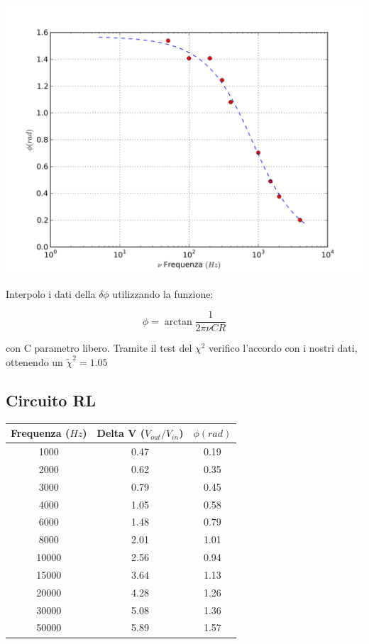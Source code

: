 \begin{center}
 \includegraphics[scale=0.70]{grafici/C3/fasecap.png}
\end{center}



Interpolo i dati della $\delta \phi$ utilizzando la funzione:

$$ \phi = \arctan \frac{1}{2\pi\nu C R} $$

con C parametro libero. Tramite il test del $\chi^2$ verifico l'accordo con i nostri dati, ottenendo un $\tilde{\chi}^2 = 1.05$

\subsection{Circuito RL}
\begin{center}

\begin{tabular}{*{3}{c}}
Frequenza ($Hz$) & Delta V ($V_{out}/V_{in}$) & $\phi (rad)$ \\
\midrule
1000& 0.47 & 0.19 \\
2000 & 0.62 & 0.35\\
3000 & 0.79 & 0.45\\
4000 & 1.05 & 0.58\\
6000 & 1.48 & 0.79\\
8000 & 2.01 & 1.01\\
10000 & 2.56 & 0.94\\
15000 & 3.64 & 1.13\\
20000 & 4.28 & 1.26\\
30000 & 5.08 & 1.36\\
50000 & 5.89 & 1.57\\
\end{tabular}
\end{center}



